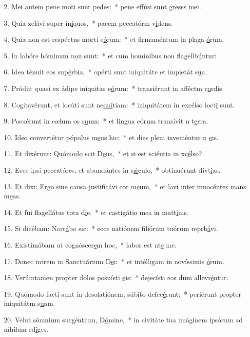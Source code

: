 2. Mei autem pene moti sunt p\uline{e}des:~* pene effúsi sunt gresss m\uline{e}i.\par 
3. Quia zelávi super in\uline{í}quos,~* pacem peccatórm v\uline{i}dens.\par 
4. Quia non est respéctus morti e\uline{ó}rum:~* et firmaméntum in plaga \uline{ó}rum.\par 
5. In labóre hóminum n\uline{o}n sunt:~* et cum homínibus non flagellb\uline{ú}ntur:\par 
6. Ideo ténuit eos sup\uline{é}rbia,~* opérti sunt iniquitáte et impietát s\uline{u}a.\par 
7. Pródiit quasi ex ádipe iníquitas e\uline{ó}rum:~* transiérunt in afféctm c\uline{o}rdis.\par 
8. Cogitavérunt, et locúti sunt ne\uline{quí}tiam:~* iniquitátem in excélso loct\uline{i} sunt.\par 
9. Posuérunt in cælum os s\uline{u}um:~* et lingua eórum transívit n t\uline{e}rra.\par 
10. Ideo convertétur pópulus m\uline{e}us hic:~* et dies pleni inveniéntur n \uline{e}is.\par 
11. Et dixérunt: Quómodo scit D\uline{e}us,~* et si est sciéntia in xc\uline{é}lso?\par 
12. Ecce ipsi peccatóres, et abundántes in s\uline{ǽ}culo,~* obtinuérunt divt\uline{i}as.\par 
13. Et dixi: Ergo sine causa justificávi cor m\uline{e}um,~* et lavi inter innocéntes mans m\uline{e}as.\par 
14. Et fui flagellátus tota d\uline{i}e,~* et castigátio mea in matt\uline{í}nis.\par 
15. Si dicébam: Narr\uline{á}bo sic:~* ecce natiónem filiórum tuórum reprb\uline{á}vi.\par 
16. Existimábam ut cognóscer\uline{e}m hoc,~* labor est nt\uline{e} me.\par 
17. Donec intrem in Sanctuárium D\uline{e}i:~* et intélligam in novíssimis \uline{ó}rum.\par 
18. Verúmtamen propter dolos posuísti \uline{e}is:~* dejecísti eos dum allevr\uline{é}ntur.\par 
19. Quómodo facti sunt in desolatiónem, súbito defec\uline{é}runt:~* periérunt propter iniquitátm s\uline{u}am.\par 
20. Velut sómnium surgéntium, D\uline{ó}mine,~* in civitáte tua imáginem ipsórum ad níhilum rd\uline{i}ges.\par 
